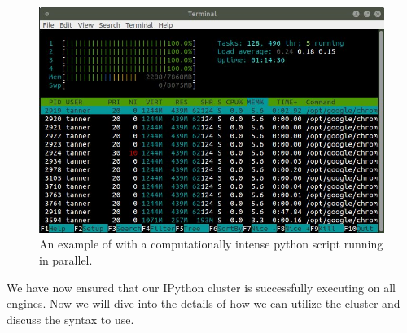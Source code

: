 \begin{figure}
    \includegraphics[width=\textwidth]{cluster_active.jpg}
\caption{An example of  with a computationally intense python script running in parallel.}
\label{fig:htop_cluster}
\end{figure}

We have now ensured that our IPython cluster is successfully executing on all engines. Now we will dive into the details of how we can utilize the cluster and discuss the syntax to use.
